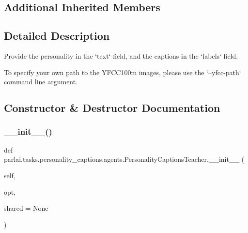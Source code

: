 \subsection*{Additional Inherited Members}


\subsection{Detailed Description}
\begin{DoxyVerb}Provide the personality in the `text` field, and the captions in the `labels` field.

To specify your own path to the YFCC100m images, please use the `--yfcc-path`
command line argument.
\end{DoxyVerb}
 

\subsection{Constructor \& Destructor Documentation}
\mbox{\label{classparlai_1_1tasks_1_1personality__captions_1_1agents_1_1PersonalityCaptionsTeacher_a629424710e209cb59e97404a313a97a8}} 
\subsubsection{\texorpdfstring{\+\_\+\+\_\+init\+\_\+\+\_\+()}{\_\_init\_\_()}}
{\footnotesize\ttfamily def parlai.\+tasks.\+personality\+\_\+captions.\+agents.\+Personality\+Captions\+Teacher.\+\_\+\+\_\+init\+\_\+\+\_\+ (\begin{DoxyParamCaption}\item[{}]{self,  }\item[{}]{opt,  }\item[{}]{shared = {\ttfamily None} }\end{DoxyParamCaption})}



